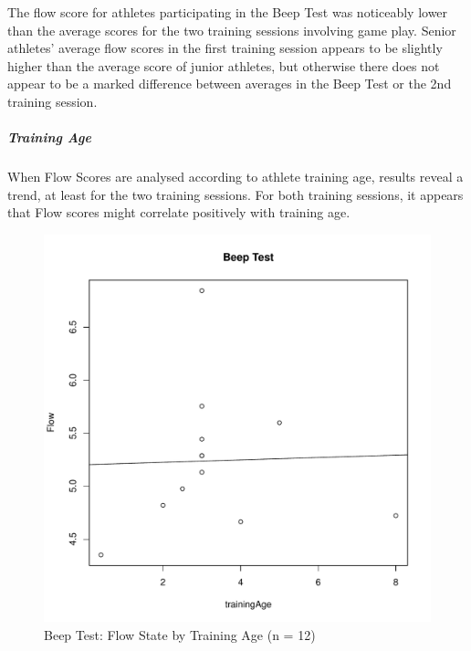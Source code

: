 \begin{CJK}{UTF8}{gbsn}
The flow score for athletes participating in the Beep Test was noticeably lower than the average scores for the two training sessions involving game play. Senior athletes' average flow scores in the first training session appears to be slightly higher than the average score of junior athletes, but otherwise there does not appear to be a marked difference between averages in the Beep Test or the 2nd training session.

\subparagraph{Training Age}

When Flow Scores are analysed according to athlete training age, results reveal a trend, at least for the two training sessions. For both training sessions, it appears that Flow scores might correlate positively with training age.


\begin{figure}[htbp]
  \centering
\includegraphics[scale=.5]{images/beepFlowTrainingAge.pdf}
  \caption{Beep Test: Flow State by Training Age (n = 12)}
  \label{fig:beepFlowTrainingAge}
\end{figure}


\end{CJK}
